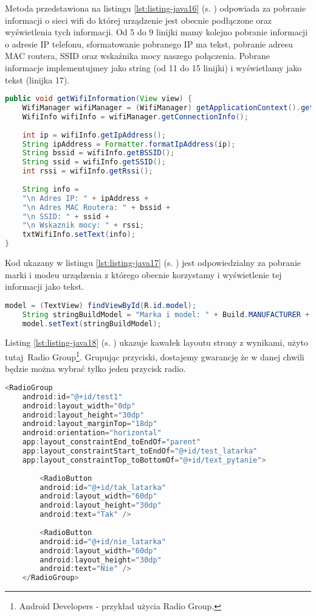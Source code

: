 \newpage

Metoda przedstawiona na listingu \ref{lst:listing-java16} (s. \pageref{lst:listing-java16}) odpowiada za pobranie informacji o sieci wifi do której urządzenie jest obecnie podłączone oraz wyświetlenia tych informacji. Od 5 do 9 linijki mamy kolejno pobranie informacji o adresie IP telefonu, sformatowanie pobranego IP ma tekst, pobranie adresu MAC routera, SSID oraz wskaźnika mocy naszego połączenia. Pobrane informacje implementujmey jako string (od 11 do 15 linijki) i wyświetlamy jako tekst (linijka 17).
\begin{lstlisting}[caption=Wifi - Pobieranie informacji o Wifi, label={lst:listing-java16}, language=Java]
    public void getWifiInformation(View view) {
	WifiManager wifiManager = (WifiManager) getApplicationContext().getSystemService(WIFI_SERVICE);
	WifiInfo wifiInfo = wifiManager.getConnectionInfo();
	
	int ip = wifiInfo.getIpAddress();
	String ipAddress = Formatter.formatIpAddress(ip);
	String bssid = wifiInfo.getBSSID();
	String ssid = wifiInfo.getSSID();
	int rssi = wifiInfo.getRssi();
		
	String info =
	"\n Adres IP: " + ipAddress +
	"\n Adres MAC Routera: " + bssid +
	"\n SSID: " + ssid +
	"\n Wskaznik mocy: " + rssi;
	txtWifiInfo.setText(info);	
}
\end{lstlisting}


Kod ukazany w listingu \ref{lst:listing-java17} (s. \pageref{lst:listing-java17}) jest odpowiedzialny za pobranie marki i modeu urządzenia z którego obecnie korzystamy i wyświetlenie tej informacji jako tekst.
\begin{lstlisting}[caption=Wyniki - Pobranie marki i modelu urządzenia, label={lst:listing-java17}, language=Java]
	model = (TextView) findViewById(R.id.model);
	String stringBuildModel = "Marka i model: " + Build.MANUFACTURER + " " + Build.MODEL;
	model.setText(stringBuildModel);
\end{lstlisting}

\newpage


Listing \ref{lst:listing-java18} (s. \pageref{lst:listing-java18}) ukazuje kawałek layoutu strony z wynikami, użyto tutaj~Radio Group\footnote{Android Developers - przykład użycia Radio Group\cite{www1}.}. Grupując przyciski, dostajemy gwarancję że w danej chwili będzie można wybrać tylko jeden przycisk radio.
\begin{lstlisting}[caption=Wyniki - Radio Group, label={lst:listing-java18}, language=Java]
	<RadioGroup
	android:id="@+id/test1"
	android:layout_width="0dp"
	android:layout_height="30dp"
	android:layout_marginTop="18dp"
	android:orientation="horizontal"
	app:layout_constraintEnd_toEndOf="parent"
	app:layout_constraintStart_toEndOf="@+id/test_latarka"
	app:layout_constraintTop_toBottomOf="@+id/text_pytanie">
	
		<RadioButton
		android:id="@+id/tak_latarka"
		android:layout_width="60dp"
		android:layout_height="30dp"
		android:text="Tak" />
		
		<RadioButton
		android:id="@+id/nie_latarka"
		android:layout_width="60dp"
		android:layout_height="30dp"
		android:text="Nie" />
	</RadioGroup>
\end{lstlisting}




